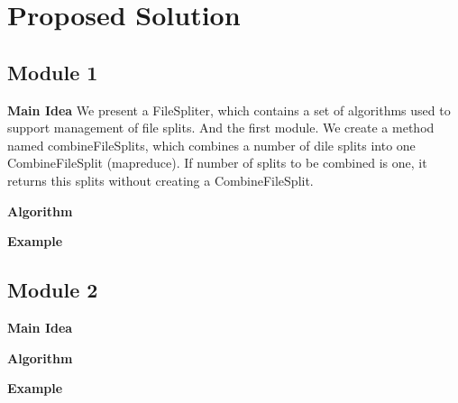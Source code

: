 \section{Proposed Solution}
\label{sect:solution}


  

\subsection{Module 1}
\label{subsec:module1}

\textbf{Main Idea}
We present a FileSpliter, which contains a set of algorithms used to support management of file splits. And the first module. We  create a method named combineFileSplits, which combines a number of dile splits into one CombineFileSplit (mapreduce). If number of splits to be combined is one, it returns this splits without creating a CombineFileSplit. 


\textbf{Algorithm}





\textbf{Example}


\subsection{Module 2}
\label{subsec:module2}
\textbf{Main Idea}


\textbf{Algorithm}



\textbf{Example}

